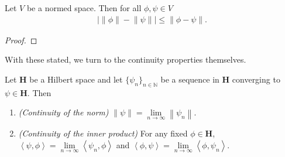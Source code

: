 \begin{proposition}
    \label{prpstn:reverse-triangle-inequality}
    \leanok
    Let $V$ be a normed space. Then for all $\phi, \psi \in V$
    \begin{align}
        \left\lvert \left\| \phi \right\| - \left\| \psi \right\| \right\rvert \le \left\| \phi - \psi \right\|.
    \end{align}
\end{proposition}
\begin{proof}
\leanok
\end{proof}

With these stated, we turn to the continuity properties themselves.

\begin{proposition}
    \label{prpstn:continuity-of-norm-and-inner-product}
    \leanok
    Let $\mathbf{H}$ be a Hilbert space and let $\{ \psi_n \}_{n \in \mathbb{N}}$ be a sequence in $\mathbf{H}$ converging to $\psi \in \mathbf{H}$. Then
    \begin{enumerate}
        \item \textit{(Continuity of the norm)} $\left\| \psi \right\| = \lim\limits_{n \rightarrow \infty} \left\| \psi_n \right\|$.
        \item \textit{(Continuity of the inner product)} For any fixed $\phi \in \mathbf{H}$, $\left< \psi, \phi \right> = \lim\limits_{n \rightarrow \infty} \left< \psi_n, \phi \right>$ and $\left< \phi, \psi \right> = \lim\limits_{n \rightarrow \infty} \left< \phi, \psi_n \right>$.
    \end{enumerate}
\end{proposition}
